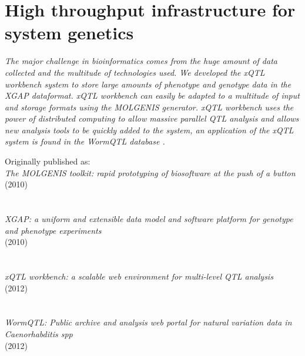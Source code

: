 \chapter{High throughput infrastructure for system genetics}
\thispagestyle{empty}
\label{chap:xqtlwormbench}

\emph{The major challenge in bioinformatics comes from the huge amount of data collected and the 
multitude of technologies used. We developed the xQTL workbench system\cite{Arends:2012} to store 
large amounts of phenotype and genotype data in the XGAP \cite{Swertz:2010a} dataformat. xQTL 
workbench can easily be adapted to a multitude of input and storage formats using the MOLGENIS 
\cite{Swertz:2004} generator. xQTL workbench uses the power of distributed computing to allow 
massive parallel QTL analysis and allows new analysis tools to be quickly added to the system, 
an application of the xQTL system is found in the WormQTL database \cite{Snoek:2012}.}

\null
\vfill

\begin{myexampleblock}{Originally published as:}
  \\
  \emph{The MOLGENIS toolkit: rapid prototyping of biosoftware at the push of a button}\\
   (2010)\\\\

  \\
  \emph{XGAP: a uniform and extensible data model and software platform for genotype and phenotype experiments}\\
   (2010)\\\\

  \\
  \emph{xQTL workbench: a scalable web environment for multi-level QTL analysis}\\
   (2012)\\\\

  \\
  \emph{WormQTL: Public archive and analysis web portal for natural variation data in Caenorhabditis spp}\\
   (2012)
\end{myexampleblock}

